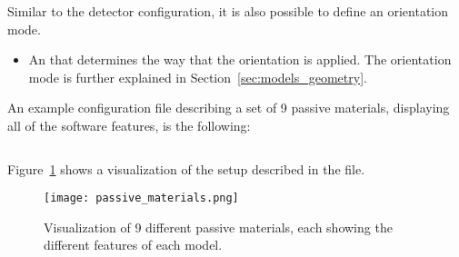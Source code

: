 \begin{itemize}
Similar to the detector configuration, it is also possible to define an orientation mode.
\begin{itemize}
\item An  that determines the way that the orientation is applied.
The orientation mode is further explained in Section~\ref{sec:models_geometry}.
\end{itemize}

An example configuration file describing a set of 9 passive materials, displaying all of the software features, is the following:
\inputminted[frame=single,framesep=3pt,breaklines=true,tabsize=2,linenos]{ini}{../../etc/manual_passive_materials.conf}
Figure~\ref{fig:passivematerials} shows a visualization of the setup described in the file.

\begin{figure}[t]
  \centering
  \texttt{[image: passive\_materials.png]}
  \caption{Visualization of 9 different passive materials, each showing the different features of each model.}
  \label{fig:passivematerials}
\end{figure}



\end{itemize}

